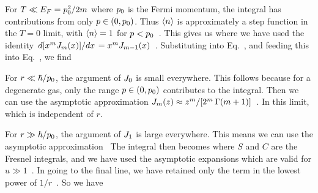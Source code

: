{	For $T \ll E_F = p_0^2 / 2m$ where $p_0$ is the Fermi momentum, the integral has contributions from only $p \in (0, p_0)$.  Thus $\evn$ is approximately a step function in the $T = 0$ limit, with $\evn = 1$ for $p < p_0$~\cite[p.~357]{Landau}.  This gives us
	where we have used the identity $\dv*{[ x^m J_m(x) ]}{x} = x^m J_{m-1}(x)$~\cite{BesselJ}.  Substituting into Eq.~,
	and feeding this into Eq.~, we find
	
	For $r \ll \hbar / p_0$, the argument of $J_0$ is small everywhere.  This follows because for a degenerate gas, only the range $p \in (0, p_0)$ contributes to the integral.  Then we can use the asymptotic approximation $J_m(z) \approx z^m / [ 2^m \,\Gamma(m + 1) ]$~\cite{BesselJ}.  In this limit,
	which is independent of $r$.
	
	For $r \gg \hbar / p_0$, the argument of $J_1$ is large everywhere.  This means we can use the asymptotic approximation~\cite{Bessel}
	The integral then becomes
	where $S$ and $C$ are the Fresnel integrals, and we have used the asymptotic expansions
	which are valid for $u \gg 1$~\cite{Fresnel}.  In going to the final line, we have retained only the term in the lowest power of $1 / r$~\cite[p.~357]{Landau}.  So we have

}
